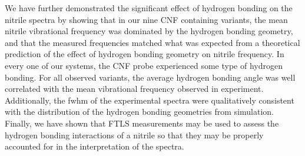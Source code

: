 We have further demonstrated the significant effect of hydrogen bonding on the nitrile spectra by showing that in our nine CNF containing variants, the mean nitrile vibrational frequency was dominated by the hydrogen bonding geometry, and that the measured frequencies matched what was expected from a theoretical prediction of the effect of hydrogen bonding geometry on nitrile frequency.
In every one of our systems, the CNF probe experienced some type of hydrogen bonding.
For all observed variants, the average hydrogen bonding angle was well correlated with the mean vibrational frequency observed in experiment.
Additionally, the fwhm of the experimental spectra were qualitatively consistent with the distribution of the hydrogen bonding geometries from simulation.
Finally, we have shown that FTLS measurements may be used to assess the hydrogen bonding interactions of a nitrile so that they may be properly accounted for in the interpretation of the spectra.





